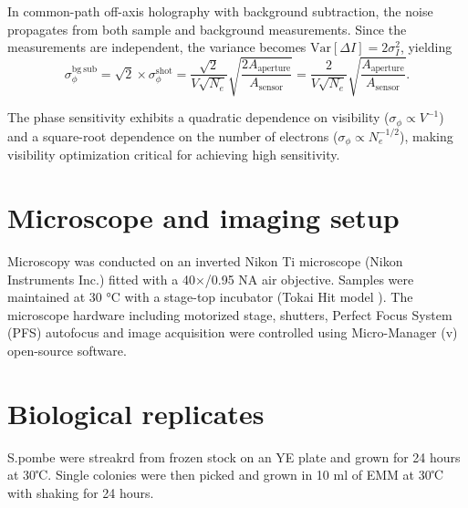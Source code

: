 In common-path off-axis holography with background subtraction, the noise propagates from both sample and background measurements. Since the measurements are independent, the variance becomes $\mathrm{Var}[\Delta I] = 2\sigma_I^2$, yielding
\begin{equation}
\sigma_{\phi}^{\mathrm{bg\ sub}} = \sqrt{2} \times \sigma_{\phi}^{\mathrm{shot}} = \frac{\sqrt{2}}{V\sqrt{N_e}} \sqrt{\frac{2A_{\mathrm{aperture}}}{A_{\mathrm{sensor}}}} = \frac{2}{V\sqrt{N_e}} \sqrt{\frac{A_{\mathrm{aperture}}}{A_{\mathrm{sensor}}}}.
\end{equation}

The phase sensitivity exhibits a quadratic dependence on visibility ($\sigma_{\phi} \propto V^{-1}$) and a square-root dependence on the number of electrons ($\sigma_{\phi} \propto N_e^{-1/2}$), making visibility optimization critical for achieving high sensitivity.


\newpage
\section{Microscope and imaging setup}
Microscopy was conducted on an inverted Nikon Ti microscope (Nikon Instruments Inc.) fitted with a 40×/0.95 NA air objective. Samples were maintained at 30 °C with a stage-top incubator (Tokai Hit model ). The microscope hardware including motorized stage, shutters, Perfect Focus System (PFS) autofocus and image acquisition were controlled using Micro-Manager (v) open-source software.
\section{Biological replicates}
S.pombe were streakrd from frozen stock on an YE plate and grown for 24 hours at 30℃. Single colonies were then picked and grown in 10 ml of EMM at 30℃ with shaking for 24 hours.

